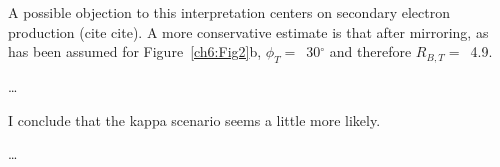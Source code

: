   A possible objection to this interpretation centers on secondary
  electron production (cite cite). A more conservative estimate is
  that after mirroring, as has been assumed for Figure~\ref{ch6:Fig2}b,
  $\phi_T =$~30$^\circ$ and therefore $R_{B,T} =$~4.9. 

  \dots

  I conclude that the kappa scenario seems a little more likely.

  \dots


  






